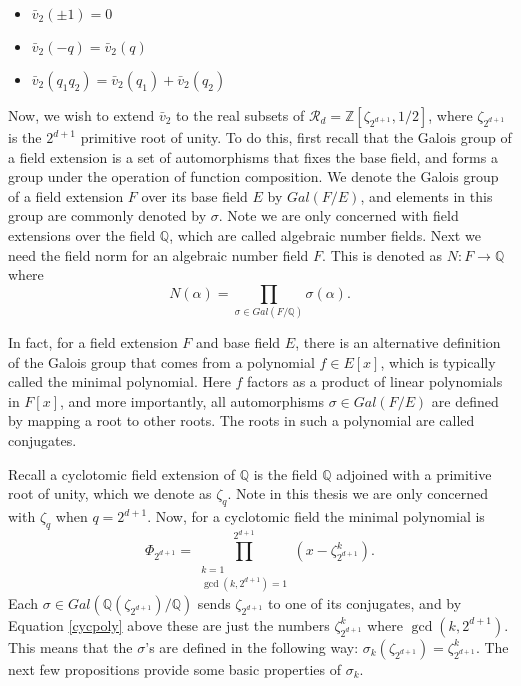 \documentclass[12pt]{dalthesis}
\begin{document}
\begin{proposition} \hspace{10mm}
\begin{itemize}
\item $\bar{v}_2(\pm 1) = 0$
\item $\bar{v}_2 (-q) = \bar{v}_2 (q)$
\item $\bar{v}_2(q_1q_2) = \bar{v}_2 (q_1) + \bar{v}_2 (q_2)$
\end{itemize}
\end{proposition}

Now, we wish to extend $\bar{v}_2$ to the real subsets of $\mathcal{R}_d = \mathbb{Z}[\zeta_{2^{d+1}}, 1/2]$, where $\zeta_{2^{d+1}}$ is the $2^{d+1}$ primitive root of unity. To do this, first recall that the Galois group of a field extension is a set of automorphisms that fixes the base field, and forms a group under the operation of function composition. We denote the Galois group of a field extension $F$ over its base field $E$ by $Gal(F/E)$, and elements in this group are commonly denoted by $\sigma$. Note we are only concerned with field extensions over the field $\mathbb{Q}$, which are called algebraic number fields. Next we need the field norm for an algebraic number field $F$. This is denoted as $N: F \longrightarrow \mathbb{Q}$ where
\begin{equation*}
N (\alpha) = \prod\limits_{\sigma \in Gal(F/\mathbb{Q})} \sigma (\alpha). 
\end{equation*} 

In fact, for a field extension $F$ and base field $E$, there is an alternative definition of the Galois group that comes from a polynomial $f \in E[x]$, which is typically called the minimal polynomial. Here $f$ factors as a product of linear polynomials in $F[x]$, and more importantly, all automorphisms $\sigma \in Gal(F/E)$ are defined by mapping a root to other roots. The roots in such a polynomial are called conjugates. 

Recall a cyclotomic field extension of $\mathbb{Q}$ is the field $\mathbb{Q}$ adjoined with a primitive root of unity, which we denote as $\zeta_q$. Note in this thesis we are only concerned with $\zeta_q$ when $q = 2^{d+1}$. Now, for a cyclotomic field the minimal polynomial is 
\begin{equation}
\label{cycpoly}
\Phi_{2^{d+1}} = \prod\limits_{\substack{k = 1 \\ \gcd (k, 2^{d+1}) = 1}}^{2^{d+1}} (x-\zeta_{2^{d+1}}^k).
\end{equation}
Each $\sigma \in Gal(\mathbb{Q}(\zeta_{2^{d+1}})/\mathbb{Q})$ sends $\zeta_{2^{d+1}}$ to one of its conjugates, and by Equation \ref{cycpoly} above these are just the numbers $\zeta_{2^{d+1}}^k$ where $\gcd (k, 2^{d+1})$. This means that the $\sigma$'s are defined in the following way: $\sigma_k (\zeta_{2^{d+1}}) = \zeta_{2^{d+1}}^k$. The next few propositions provide some basic properties of $\sigma_k$.
\end{document}
